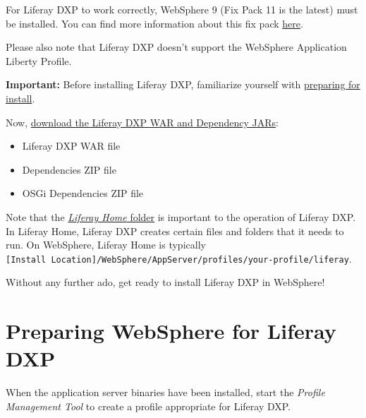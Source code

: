 \noindent\hrulefill

For Liferay DXP to work correctly, WebSphere 9 (Fix Pack 11 is the
latest) must be installed. You can find more information about this fix
pack
\href{http://www-01.ibm.com/support/docview.wss?uid=swg24043005}{here}.

Please also note that Liferay DXP doesn't support the WebSphere
Application Liberty Profile.

\noindent\hrulefill

\textbf{Important:} Before installing Liferay DXP, familiarize yourself
with
\href{/docs/7-2/deploy/-/knowledge_base/d/preparing-for-install}{preparing
for install}.

\noindent\hrulefill

Now,
\href{/docs/7-2/deploy/-/knowledge_base/d/obtaining-product\#downloading-the-liferay-war-and-dependency-jars}{download
the Liferay DXP WAR and Dependency JARs}:

\begin{itemize}
\tightlist
\item
  Liferay DXP WAR file
\item
  Dependencies ZIP file
\item
  OSGi Dependencies ZIP file
\end{itemize}

Note that the
\href{docs/7-2/deploy/-/knowledge_base/d/liferay-home}{\emph{Liferay
Home} folder} is important to the operation of Liferay DXP. In Liferay
Home, Liferay DXP creates certain files and folders that it needs to
run. On WebSphere, Liferay Home is typically
\texttt{{[}Install\ Location{]}/WebSphere/AppServer/profiles/your-profile/liferay}.

Without any further ado, get ready to install Liferay DXP in WebSphere!

\section{Preparing WebSphere for Liferay
DXP}\label{preparing-websphere-for-liferay-dxp}

When the application server binaries have been installed, start the
\emph{Profile Management Tool} to create a profile appropriate for
Liferay DXP.

